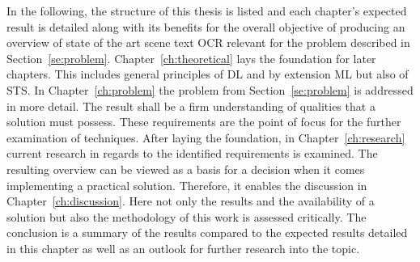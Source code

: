 In the following, the structure of this thesis is listed and each chapter's expected
result is detailed along with its benefits for the overall objective of producing an overview of
state of the art scene text \ac{OCR} relevant for the problem described in Section~\ref{se:problem}.
Chapter~\ref{ch:theoretical} lays the foundation for later chapters.
This includes general principles of \ac{DL} and by extension \ac{ML} but also of \ac{STS}.
In Chapter~\ref{ch:problem} the problem from Section~\ref{se:problem} is addressed in more detail.
The result shall be a firm understanding of qualities that a solution must possess.
These requirements are the point of focus for the further examination of techniques.
After laying the foundation, in Chapter~\ref{ch:research} current research in regards to the
identified requirements is examined.
The resulting overview can be viewed as a basis for a decision when it comes implementing a practical
solution.
Therefore, it enables the discussion in Chapter~\ref{ch:discussion}.
Here not only the results and the availability of a solution but also the methodology of this work
is assessed critically.
The conclusion is a summary of the results compared to the expected results detailed in this chapter
as well as an outlook for further research into the topic.
